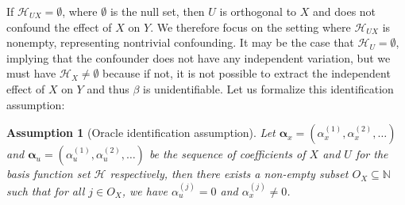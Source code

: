 \documentclass[
  12pt]{article}
\newcommand{\calH}{\mathcal{H}}
\newcommand{\balp}{\boldsymbol{\alpha}}
\newtheorem{assumption}{Assumption}
\begin{document}
If $\calH_{UX}=\emptyset$, where $\emptyset$ is the null set, then $U$ is orthogonal to $X$ and does not confound the effect of $X$ on $Y$. We therefore focus on the setting where $\calH_{UX}$ is nonempty, representing nontrivial confounding. It may be the case that $\calH_U = \emptyset$, implying that the confounder does not have any independent variation, but we must have $\calH_X \neq \emptyset$ because if not, it is not possible to extract the independent effect of $X$ on $Y$ and thus $\beta$ is unidentifiable. Let us formalize this identification assumption:
\begin{assumption}[Oracle identification assumption]\label{asm:identify}
Let $\balp_x = (\alpha_x^{(1)}, \alpha_x^{(2)}, \dots)$ and $\balp_u = (\alpha_u^{(1)}, \alpha_u^{(2)}, \dots)$ be the sequence of coefficients of $X$ and $U$ for the basis function set $\calH$ respectively, then there exists a non-empty subset $O_{X} \subseteq \mathbb N$ 
such that for all $j \in O_X$, we have $\alpha_u^{(j)} = 0$ and $\alpha_x^{(j)} \neq 0$. 
\end{assumption}
\end{document}
